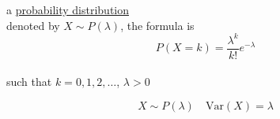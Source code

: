 \documentclass[a4paper,12pt]{article}
\newcommand{\?}{\stackrel{?}{=}}
\begin{document}
\newenvironment{note}
  {\begin{bclogo}[logo=\bcinfo, couleurBarre=orange, couleur=lightgray]{ note}}
  {\end{bclogo}}
\newenvironment{attention}
  {\begin{bclogo}[logo=\bcattention, couleurBarre=red, noborder=true, 
                couleur=red!15]{Important!}}
  {\end{bclogo}}

a \href{20230120140123-probability_distribution.org}{probability distribution}\\[0pt]
denoted by \(X \sim P(\lambda)\), the formula is\\[0pt]
\[
P(X=k)=\frac{\lambda^k}{k!}e^{-\lambda}
\]\\[0pt]
such that \(k=0,1,2,\dots\), \(\lambda>0\)\\[0pt]
\begin{characteristic}
\[
X \sim P(\lambda) \quad \mathrm{Var}(X) = \lambda
\]\\[0pt]
\end{characteristic}
\end{document}
